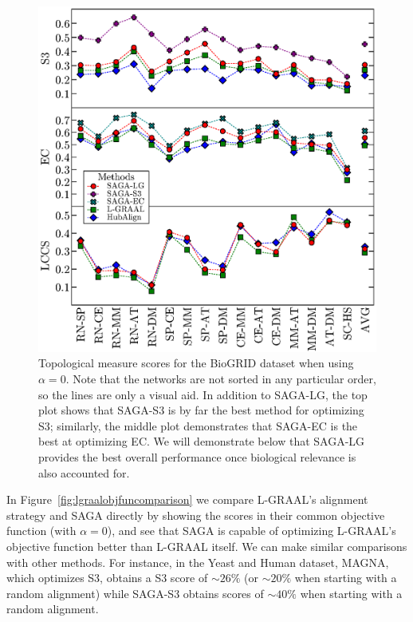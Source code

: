 \documentclass{bioinfo}
\begin{document}
\begin{figure}
\centering
\includegraphics[width=0.99\linewidth]{biogrid_alpha0_bw.eps}
\caption{Topological measure scores for the BioGRID dataset when using $\alpha=0$. Note that the networks are not sorted in any particular order, so the lines are only a visual aid. In addition to SAGA-LG, the top plot shows that SAGA-S3 is by far the best method for optimizing S3; similarly, the middle plot demonstrates that SAGA-EC is the best at optimizing EC. We will demonstrate below that SAGA-LG provides the best overall performance once biological relevance is also accounted for.}
\label{fig:biogrid_alpha0}
\end{figure}

In Figure~\ref{fig:lgraalobjfuncomparison} we compare L-GRAAL's alignment strategy and SAGA directly by showing the scores in their common objective function (with $\alpha=0$), and see that SAGA is capable of optimizing L-GRAAL's objective function better than L-GRAAL itself. We can make similar comparisons with other methods. For instance, in the Yeast and Human dataset, MAGNA, which optimizes S3, obtains a S3 score of ${\sim}26\%$ (or ${\sim}20\%$ when starting with a random alignment) while SAGA-S3 obtains scores of ${\sim}40\%$ when starting with a random alignment.
\end{document}
